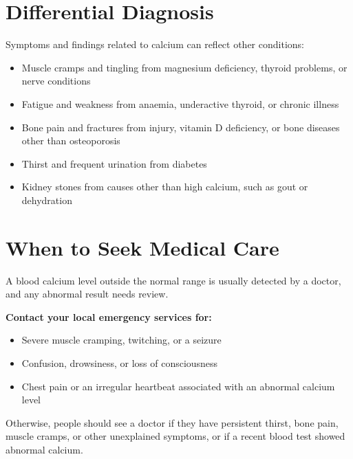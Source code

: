 \section*{Differential Diagnosis}
Symptoms and findings related to calcium can reflect other conditions:
\begin{itemize}
    \item Muscle cramps and tingling from magnesium deficiency, thyroid problems, or nerve conditions
    \item Fatigue and weakness from anaemia, underactive thyroid, or chronic illness
    \item Bone pain and fractures from injury, vitamin D deficiency, or bone diseases other than osteoporosis
    \item Thirst and frequent urination from diabetes
    \item Kidney stones from causes other than high calcium, such as gout or dehydration
\end{itemize}

\section*{When to Seek Medical Care}
A blood calcium level outside the normal range is usually detected by a doctor, and any abnormal result needs review.

\textbf{Contact your local emergency services for:}
\begin{itemize}
    \item Severe muscle cramping, twitching, or a seizure
    \item Confusion, drowsiness, or loss of consciousness
    \item Chest pain or an irregular heartbeat associated with an abnormal calcium level
\end{itemize}

Otherwise, people should see a doctor if they have persistent thirst, bone pain, muscle cramps, or other unexplained symptoms, or if a recent blood test showed abnormal calcium.

